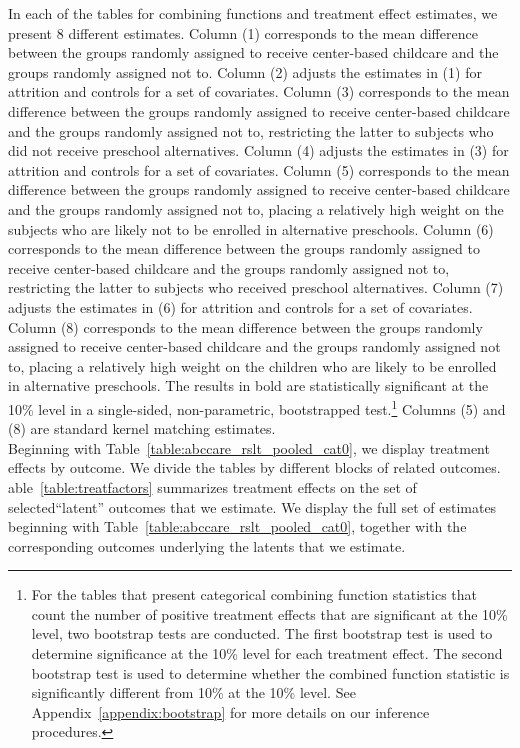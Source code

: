 \noindent In each of the tables for combining functions and treatment effect estimates, we present 8 different estimates. Column (1) corresponds to the mean difference between the groups randomly assigned to receive center-based childcare and the groups randomly assigned not to. Column (2) adjusts the estimates in (1) for attrition and controls for a set of covariates. Column (3) corresponds to the mean difference between the groups randomly assigned to receive center-based childcare and the groups randomly assigned not to, restricting the latter to subjects who did not receive preschool alternatives. Column (4) adjusts the estimates in (3) for attrition and controls for a set of covariates. Column (5) corresponds to the mean difference between the groups randomly assigned to receive center-based childcare and the groups randomly assigned not to, placing a relatively high weight on the subjects who are likely not to be enrolled in alternative preschools. Column (6) corresponds to the mean difference between the groups randomly assigned to receive center-based childcare and the groups randomly assigned not to, restricting the latter to subjects who received preschool alternatives. Column (7) adjusts the estimates in (6) for attrition and controls for a set of covariates. Column (8) corresponds to the mean difference between the groups randomly assigned to receive center-based childcare and the groups randomly assigned not to, placing a relatively high weight on the children who are likely to be enrolled in alternative preschools. The results in bold are statistically significant at the 10\% level in a single-sided, non-parametric, bootstrapped test.\footnote{For the tables that present categorical combining function statistics that count the number of positive treatment effects that are significant at the 10\% level, two bootstrap tests are conducted. The first bootstrap test is used to determine significance at the 10\% level for each treatment effect. The second bootstrap test is used to determine whether the combined function statistic is significantly different from 10\% at the  10\% level. See Appendix~\ref{appendix:bootstrap} for more details on our inference procedures.} Columns (5) and (8) are standard kernel matching estimates. \\

\noindent Beginning with Table~\ref{table:abccare_rslt_pooled_cat0}, we display treatment effects by outcome. We divide the tables by different blocks of related outcomes. able~\ref{table:treatfactors} summarizes treatment effects on the set of selected``latent'' outcomes that we estimate. We display the full set of estimates beginning with Table~\ref{table:abccare_rslt_pooled_cat0}, together with the corresponding outcomes underlying the latents that we estimate.

